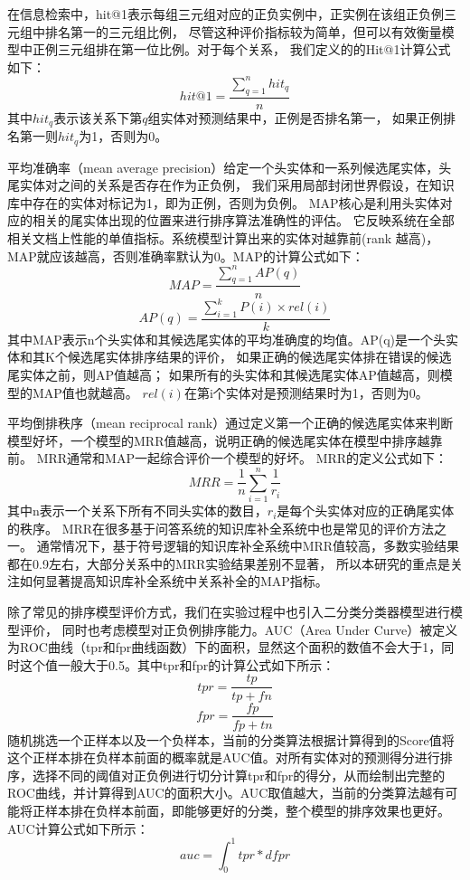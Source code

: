 在信息检索中，hit@1表示每组三元组对应的正负实例中，正实例在该组正负例三元组中排名第一的三元组比例，
尽管这种评价指标较为简单，但可以有效衡量模型中正例三元组排在第一位比例。对于每个关系，
我们定义的的Hit@1计算公式如下：
$$hit@1=\frac{\sum_{q=1}^n{hit_q}}{n}$$
其中$hit_q$表示该关系下第$q$组实体对预测结果中，正例是否排名第一，
如果正例排名第一则$hit_q$为1，否则为0。

平均准确率（mean average precision）给定一个头实体和一系列候选尾实体，头尾实体对之间的关系是否存在作为正负例，
我们采用局部封闭世界假设，在知识库中存在的实体对标记为1，即为正例，否则为负例。
MAP核心是利用头实体对应的相关的尾实体出现的位置来进行排序算法准确性的评估。
它反映系统在全部相关文档上性能的单值指标。系统模型计算出来的实体对越靠前(rank 越高)，MAP就应该越高，否则准确率默认为0。MAP的计算公式如下：
$$MAP=\frac{\sum_{q=1}^nAP(q)}{n}$$
$$AP(q)=\frac{\sum_{i=1}^kP(i)\times rel(i)}{k}$$
其中MAP表示n个头实体和其候选尾实体的平均准确度的均值。AP(q)是一个头实体和其K个候选尾实体排序结果的评价，
如果正确的候选尾实体排在错误的候选尾实体之前，则AP值越高；
如果所有的头实体和其候选尾实体AP值越高，则模型的MAP值也就越高。
$rel(i)$在第i个实体对是预测结果时为1，否则为0。


平均倒排秩序（mean reciprocal rank）通过定义第一个正确的候选尾实体来判断模型好坏，一个模型的MRR值越高，说明正确的候选尾实体在模型中排序越靠前。
MRR通常和MAP一起综合评价一个模型的好坏。
MRR的定义公式如下：
$$MRR=\frac{1}{n} \sum_{i=1}^n \frac{1}{r_i}$$
其中n表示一个关系下所有不同头实体的数目，$r_i$是每个头实体对应的正确尾实体的秩序。
MRR在很多基于问答系统的知识库补全系统\cite{West2014}中也是常见的评价方法之一。
通常情况下，基于符号逻辑的知识库补全系统中MRR值较高，多数实验结果都在0.9左右，大部分关系中的MRR实验结果差别不显著，
所以本研究的重点是关注如何显著提高知识库补全系统中关系补全的MAP指标。


除了常见的排序模型评价方式，我们在实验过程中也引入二分类分类器模型进行模型评价，
同时也考虑模型对正负例排序能力。AUC（Area Under Curve）被定义为ROC曲线（tpr和fpr曲线函数）下的面积，显然这个面积的数值不会大于1，同时这个值一般大于0.5。其中tpr和fpr的计算公式如下所示：
$$tpr=\frac{tp}{tp+fn}$$
$$fpr=\frac{fp}{fp+tn}$$
随机挑选一个正样本以及一个负样本，当前的分类算法根据计算得到的Score值将这个正样本排在负样本前面的概率就是AUC值。对所有实体对的预测得分进行排序，选择不同的阈值对正负例进行切分计算tpr和fpr的得分，从而绘制出完整的ROC曲线，并计算得到AUC的面积大小。AUC取值越大，当前的分类算法越有可能将正样本排在负样本前面，即能够更好的分类，整个模型的排序效果也更好。AUC计算公式如下所示：
$$auc=\int_{0}^{1}{tpr}*d{fpr}$$

